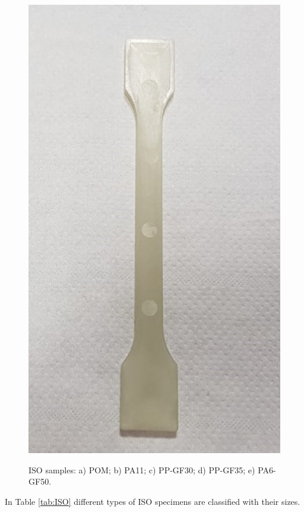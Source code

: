 \documentclass[a4paper, 11pt]{article}
\begin{document}
\begin{figure}[htp]
{\includegraphics[scale=0.25]{PA6GF}}
\captionsetup{justification=centering}
\caption{ISO samples: a) POM; b) PA11; c) PP-GF30; d) PP-GF35; e) PA6-GF50. }
\label{fig:ISO}
\end{figure}

In Table \ref{tab:ISO} different types of ISO specimens are classified with their sizes.
\end{document}
